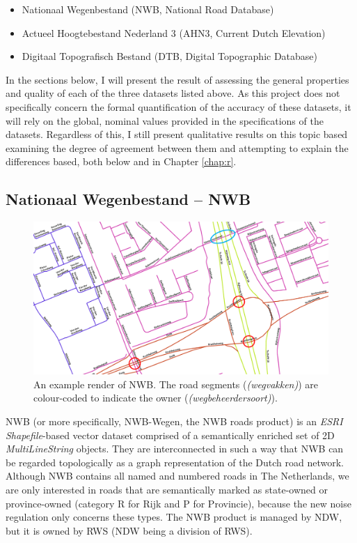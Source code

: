 \begin{itemize}
\item Nationaal Wegenbestand (NWB, National Road Database)
\item Actueel Hoogtebestand Nederland 3 (AHN3, Current Dutch Elevation)
\item Digitaal Topografisch Bestand (DTB, Digital Topographic Database)
\end{itemize}

In the sections below, I will present the result of assessing the general properties and quality of each of the three datasets listed above. As this project does not specifically concern the formal quantification of the accuracy of these datasets, it will rely on the global, nominal values provided in the specifications of the datasets. Regardless of this, I still present qualitative results on this topic based examining the degree of agreement between them and attempting to explain the differences based, both below and in Chapter \ref{chap:r}.

\subsection{Nationaal Wegenbestand – NWB}
\label{sub:nwb}

\begin{figure}
    \centering
    \includegraphics[width=\linewidth]{final_report/figs/nwb_sample_02.png} 
    \caption{An example render of NWB. The road segments (\textit{(wegvakken)}) are colour-coded to indicate the owner (\textit{(wegbeheerdersoort)}).}
    \label{fig:nwb}
\end{figure}

NWB (or more specifically, NWB-Wegen, the NWB roads product) is an \textit{ESRI Shapefile}-based vector dataset comprised of a semantically enriched set of 2D \textit{MultiLineString} objects. They are interconnected in such a way that NWB can be regarded topologically as a graph representation of the Dutch road network. Although NWB contains all named and numbered roads in The Netherlands, we are only interested in roads that are semantically marked as state-owned or province-owned (category R for Rijk and P for Provincie), because the new noise regulation only concerns these types. The NWB product is managed by NDW, but it is owned by RWS (NDW being a division of RWS).

